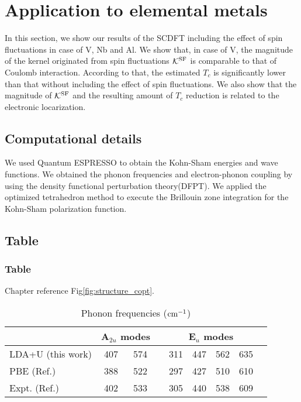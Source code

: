 

%
%
\chapter{Application to elemental metals}
In this section, we show our results of the SCDFT including the effect of spin fluctuations 
in case of V, Nb and Al. We show that, in case of V, the magnitude of the kernel originated 
from spin fluctuations $\mathcal K^{\rm SF}$ is comparable to that of Coulomb interaction.
According to that, the estimated $T_{c}$ is significantly lower than that without including the
effect of spin fluctuations. We also show that the magnitude of $\mathcal K^{\rm SF}$ and the 
resulting amount of $T_{c}$ reduction is related to the electronic locarization.

\section{Computational details}
We used Quantum ESPRESSO\cite{QE} to obtain the Kohn-Sham energies and wave functions.
We obtained the phonon frequencies and electron-phonon coupling by using the density functional
perturbation theory(DFPT)\cite{DFPT}.
We applied the optimized tetrahedron method\cite{opttetra} to execute the Brillouin zone
integration for the Kohn-Sham polarization function.

\section{Table} \label{sec:Constructing the Model}

\subsection{Table}  \label{sec:Force Constant}
Chapter reference  Fig\ref{fig:structure_copt}. 

\begin{table}[hbtp] %
  \centering
  \begin{tabular}{lcccccccc}
    \hline \hline
    &\multicolumn{2}{c}{A$_{2u}$ modes} & & \multicolumn{4}{c}{E$_u$ modes } \\ 
   \hline 
    LDA+U (this work)  & 407  & 574  & & 311 & 447 & 562 & 635\\
    PBE (Ref.\cite{Ye2014}) & 388 & 522 & & 297 & 427 & 510 & 610  \\
    Expt. (Ref.\cite{Lucovsky1977})  & 402 & 533  & & 305 & 440 & 538 & 609 \\
    \hline \hline
  \end{tabular}
    \caption{Phonon frequencies ($\rm{cm^{-1}}$) }
\label{tab:freq}
\end{table}



